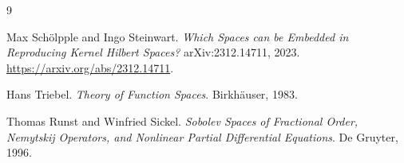 \documentclass[11pt]{article}
\begin{document}
\begin{thebibliography}{9}

Max Sch\"olpple and Ingo Steinwart.
\newblock \emph{Which Spaces can be Embedded in Reproducing Kernel Hilbert Spaces?}
\newblock arXiv:2312.14711, 2023.
\newblock \url{https://arxiv.org/abs/2312.14711}.

Hans Triebel.
\newblock \emph{Theory of Function Spaces}.
\newblock Birkh\"auser, 1983.

Thomas Runst and Winfried Sickel.
\newblock \emph{Sobolev Spaces of Fractional Order, Nemytskij Operators, and Nonlinear Partial Differential Equations}.
\newblock De Gruyter, 1996.

\end{thebibliography}
\end{document}
